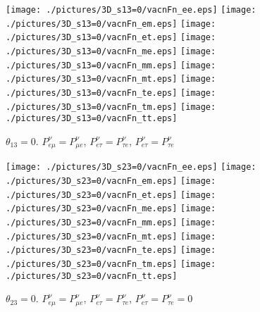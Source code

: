 \begin{figure}[!ht]
\vspace*{-0.75cm}
\texttt{[image: ./pictures/3D\_s13=0/vacnFn\_ee.eps]}\hspace*{-2mm}
\texttt{[image: ./pictures/3D\_s13=0/vacnFn\_em.eps]}\hspace*{-2mm}
\texttt{[image: ./pictures/3D\_s13=0/vacnFn\_et.eps]}\hspace*{-2mm}
\texttt{[image: ./pictures/3D\_s13=0/vacnFn\_me.eps]}\hspace*{-2mm}
\texttt{[image: ./pictures/3D\_s13=0/vacnFn\_mm.eps]}\hspace*{-2mm}
\texttt{[image: ./pictures/3D\_s13=0/vacnFn\_mt.eps]}\hspace*{-2mm}
\texttt{[image: ./pictures/3D\_s13=0/vacnFn\_te.eps]}\hspace*{-2mm}
\texttt{[image: ./pictures/3D\_s13=0/vacnFn\_tm.eps]}\hspace*{-2mm}
\texttt{[image: ./pictures/3D\_s13=0/vacnFn\_tt.eps]}
\caption{$\theta_{13}=0$. $P^{\nu}_{e\mu}=P^{\nu}_{\mu{}e}$, $P^{\nu}_{e\tau}=P^{\nu}_{\tau{}e}$, $P^{\nu}_{e\tau}=P^{\nu}_{\tau{}e}$}
\label{vacn3DFn_s13=0}
\end{figure}
\begin{figure}[!ht]
\vspace*{-0.75cm}
\texttt{[image: ./pictures/3D\_s23=0/vacnFn\_ee.eps]}\hspace*{-2mm}
\texttt{[image: ./pictures/3D\_s23=0/vacnFn\_em.eps]}\hspace*{-2mm}
\texttt{[image: ./pictures/3D\_s23=0/vacnFn\_et.eps]}\hspace*{-2mm}
\texttt{[image: ./pictures/3D\_s23=0/vacnFn\_me.eps]}\hspace*{-2mm}
\texttt{[image: ./pictures/3D\_s23=0/vacnFn\_mm.eps]}\hspace*{-2mm}
\texttt{[image: ./pictures/3D\_s23=0/vacnFn\_mt.eps]}\hspace*{-2mm}
\texttt{[image: ./pictures/3D\_s23=0/vacnFn\_te.eps]}\hspace*{-2mm}
\texttt{[image: ./pictures/3D\_s23=0/vacnFn\_tm.eps]}\hspace*{-2mm}
\texttt{[image: ./pictures/3D\_s23=0/vacnFn\_tt.eps]}
\caption{$\theta_{23}=0$. $P^{\nu}_{e\mu}=P^{\nu}_{\mu{}e}$, $P^{\nu}_{e\tau}=P^{\nu}_{\tau{}e}$, $P^{\nu}_{e\tau}=P^{\nu}_{\tau{}e}=0$}
\label{vacn3DFn_s23=0}
\end{figure}

\begin{comment}
\begin{figure}[!ht]
\texttt{[image: ./pictures/vac3an\_aa.eps]}
\texttt{[image: ./pictures/vac3an\_ab.eps]}
\texttt{[image: ./pictures/vac3an\_ba.eps]}
\caption{vac3an}
\label{vac3an}
\end{figure}
\end{comment}
